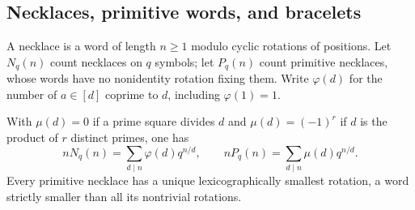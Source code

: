 \subsection{Necklaces, primitive words, and bracelets}
A necklace is a word of length $n\ge1$ modulo cyclic rotations of positions.
Let $N_q(n)$ count necklaces on $q$ symbols; let $P_q(n)$ count primitive
necklaces, whose words have no nonidentity rotation fixing them. Write
$\varphi(d)$ for the number of $a\in[d]$ coprime to $d$, including
$\varphi(1)=1$.
\begin{theorem}\label{result65}
With $\mu(d)=0$ if a prime square divides $d$ and
$\mu(d)=(-1)^r$ if $d$ is the product of $r$ distinct primes, one has
\[
 n N_q(n)=\sum_{d\mid n}\varphi(d)q^{n/d},
 \qquad
 n P_q(n)=\sum_{d\mid n}\mu(d)q^{n/d}.
\]
Every primitive necklace has a unique lexicographically smallest rotation,
a word strictly smaller than all its nontrivial rotations.
\end{theorem}
